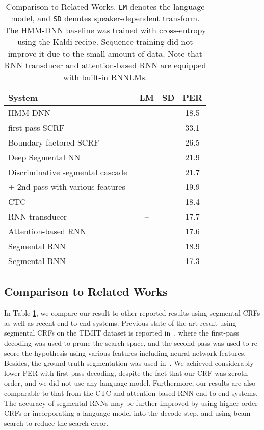 \documentclass[a4paper]{article}
\begin{document}
 \begin{table}
 \centering \small
\caption{Comparison to Related Works. {\tt LM} denotes the language model, and {\tt SD} denotes speaker-dependent transform. The HMM-DNN baseline was trained with cross-entropy using the Kaldi recipe. Sequence training did not improve it due to the small amount of data. Note that RNN transducer and attention-based RNN are equipped with built-in RNNLMs.}\vskip 1.5mm

\label{tab:compare}
\begin{tabular}{l|ccc}
\hline

\hline
System  & LM & SD & PER  \\ \hline
HMM-DNN &  &   & 18.5 \\
first-pass SCRF~\cite{zweig2012classification} &  &  & 33.1  \\
Boundary-factored SCRF~\cite{he2012efficient} &   &  & 26.5 \\
Deep Segmental NN~\cite{abdel2013deep} &  &  & 21.9 \\
Discriminative segmental cascade~\cite{tang2015discriminative} &  &  & 21.7 \\
 + 2nd pass with various features &  &  & 19.9 \\ \hline
CTC~\cite{graves2013speech} &  &  & 18.4 \\
RNN transducer~\cite{graves2013speech} & -- &  & 17.7 \\
Attention-based RNN~\cite{chorowski2015attention} & -- &  & 17.6 \\
Segmental RNN & &  & 18.9 \\
Segmental RNN & &  & 17.3 \\
 
\hline

\hline
\end{tabular}
\vskip-4mm
\end{table}


\subsection{Comparison to Related Works }

In Table \ref{tab:compare}, we compare our result to other reported results using segmental CRFs as well as recent end-to-end systems. Previous state-of-the-art result using segmental CRFs on the TIMIT dataset is reported in~\cite{tang2015discriminative}, where the first-pass decoding was used to prune the search space, and the second-pass was used to re-score the hypothesis using various features including neural network features. Besides, the ground-truth segmentation was used in~\cite{tang2015discriminative}. We achieved considerably lower PER with first-pass decoding, despite the fact that our CRF was zeroth-order, and we did not use any language model. Furthermore, our results are also comparable to that from the CTC and attention-based RNN end-to-end systems. The accuracy of segmental RNNs may be further improved by using higher-order CRFs or incorporating a language model into the decode step, and using beam search to reduce the search error.
\end{document}
